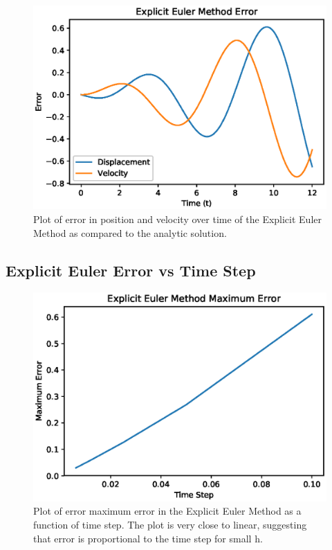 \documentclass{article}
\begin{document}
\begin{figure}[ht]
\centering
\includegraphics[scale=0.35]{exp_euler_err.eps}
\caption{Plot of error in position and velocity over time of the Explicit Euler Method as compared to the analytic solution.}
\label{fig:expeulererr}
\end{figure}

\subsection{Explicit Euler Error vs Time Step}

\begin{figure}[ht]
\centering
\includegraphics[scale=0.35]{exp_euler_max_err.eps}
\caption{Plot of error maximum error in the Explicit Euler Method as a function of time step. The plot is very close to linear, suggesting that error is proportional to the time step for small h.}
\label{fig:expeulermaxerr}
\end{figure}
\end{document}
